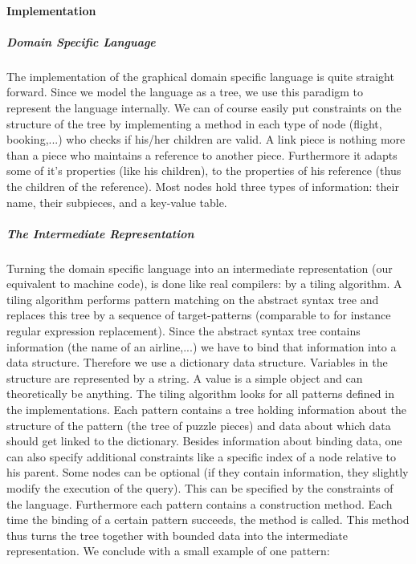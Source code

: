 \paragraph{Implementation}
\subparagraph{Domain Specific Language}
The implementation of the graphical domain specific language is quite straight
forward. Since we model the language as a tree, we use this paradigm to
represent the language internally. We can of course easily put constraints on
the structure of the tree by implementing a method in each type of node
(flight, booking,...) who checks if his/her children are valid. A link piece is
nothing more than a piece who maintains a reference to another piece.
Furthermore it adapts some of it's properties (like his children), to the
properties of his reference (thus the children of the reference). Most nodes
hold three types of information: their name, their subpieces, and a key-value
table.
\subparagraph{The Intermediate Representation}
Turning the domain specific language into an intermediate representation (our
equivalent to machine code), is done like real compilers: by a tiling
algorithm. A tiling algorithm performs pattern matching on the abstract syntax
tree and replaces this tree by a sequence of target-patterns (comparable to
for instance regular expression replacement). Since the abstract syntax tree
contains information (the name of an airline,...) we have to bind that
information into a data structure. Therefore we use a dictionary data
structure. Variables in the structure are represented by a string. A value is a
simple object and can theoretically be anything. The tiling algorithm looks for
all patterns defined in the implementations. Each pattern contains a tree
holding information about the structure of the pattern (the tree of puzzle
pieces) and data about which data should get linked to the dictionary. Besides
information about binding data, one can also specify additional constraints
like a specific index of a node relative to his parent. Some nodes can be
optional (if they contain information, they slightly modify the execution of
the query). This can be specified by the constraints of the language.
Furthermore each pattern contains a construction method. Each time the binding
of a certain pattern succeeds, the method is called. This method thus turns the
tree together with bounded data into the intermediate representation.
We conclude with a small example of one pattern:
